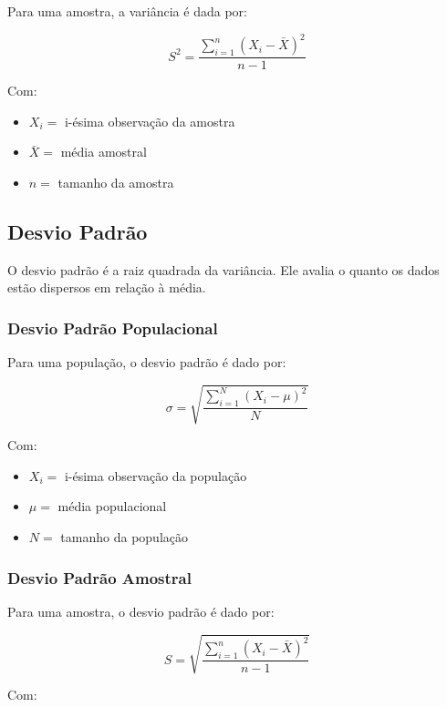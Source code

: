 \documentclass[
]{estat/estat}
\begin{document}
Para uma amostra, a variância é dada por:

\[S^2=\frac{\sum\limits_{i=1}^{n}\left(X_i - \bar{X}\right)^2}{n-1}\]

Com:

\begin{itemize}
\item
  \(X_i =\) i-ésima observação da amostra
\item
  \(\bar{X} =\) média amostral
\item
  \(n =\) tamanho da amostra
\end{itemize}

\hypertarget{desvio-padruxe3o}{%
\subsection{Desvio Padrão}\label{desvio-padruxe3o}}

O desvio padrão é a raiz quadrada da variância. Ele avalia o quanto os
dados estão dispersos em relação à média.

\hypertarget{desvio-padruxe3o-populacional}{%
\subsubsection{Desvio Padrão
Populacional}\label{desvio-padruxe3o-populacional}}

Para uma população, o desvio padrão é dado por:

\[\sigma=\sqrt{\frac{\sum\limits_{i=1}^{N}\left(X_i - \mu\right)^2}{N}}\]

Com:

\begin{itemize}
\item
  \(X_i =\) i-ésima observação da população
\item
  \(\mu =\) média populacional
\item
  \(N =\) tamanho da população
\end{itemize}

\hypertarget{desvio-padruxe3o-amostral}{%
\subsubsection{Desvio Padrão Amostral}\label{desvio-padruxe3o-amostral}}

Para uma amostra, o desvio padrão é dado por:

\[S=\sqrt{\frac{\sum\limits_{i=1}^{n}\left(X_i - \bar{X}\right)^2}{n-1}}\]

Com:
\end{document}
